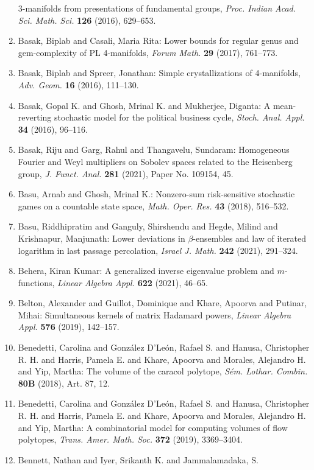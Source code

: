 \begin{enumerate}
3-manifolds from presentations of fundamental groups, \emph{Proc. Indian Acad. Sci. Math. Sci.} {\bf 126} (2016), 629--653.
\item Basak, Biplab and Casali, Maria Rita: Lower bounds for regular genus and gem-complexity of {PL}
4-manifolds, \emph{Forum Math.} {\bf 29} (2017), 761--773.
\item Basak, Biplab and Spreer, Jonathan: Simple crystallizations of 4-manifolds, \emph{Adv. Geom.} {\bf 16} (2016), 111--130.
\item Basak, Gopal K. and Ghosh, Mrinal K. and Mukherjee, Diganta: A mean-reverting stochastic model for the political business
cycle, \emph{Stoch. Anal. Appl.} {\bf 34} (2016), 96--116.
\item Basak, Riju and Garg, Rahul and Thangavelu, Sundaram: Homogeneous {F}ourier and {W}eyl multipliers on {S}obolev
spaces related to the {H}eisenberg group, \emph{J. Funct. Anal.} {\bf 281} (2021), Paper No. 109154, 45.
\item Basu, Arnab and Ghosh, Mrinal K.: Nonzero-sum risk-sensitive stochastic games on a countable
state space, \emph{Math. Oper. Res.} {\bf 43} (2018), 516--532.
\item Basu, Riddhipratim and Ganguly, Shirshendu and Hegde, Milind
and Krishnapur, Manjunath: Lower deviations in {$\beta$}-ensembles and law of iterated
logarithm in last passage percolation, \emph{Israel J. Math.} {\bf 242} (2021), 291--324.
\item Behera, Kiran Kumar: A generalized inverse eigenvalue problem and {$m$}-functions, \emph{Linear Algebra Appl.} {\bf 622} (2021), 46--65.
\item Belton, Alexander and Guillot, Dominique and Khare, Apoorva
and Putinar, Mihai: Simultaneous kernels of matrix {H}adamard powers, \emph{Linear Algebra Appl.} {\bf 576} (2019), 142--157.
\item Benedetti, Carolina and Gonz\'{a}lez D'Le\'{o}n, Rafael S. and Hanusa,
Christopher R. H. and Harris, Pamela E. and Khare, Apoorva and
Morales, Alejandro H. and Yip, Martha: The volume of the caracol polytope, \emph{S\'{e}m. Lothar. Combin.} {\bf 80B} (2018), Art. 87, 12.
\item Benedetti, Carolina and Gonz\'{a}lez D'Le\'{o}n, Rafael S. and Hanusa,
Christopher R. H. and Harris, Pamela E. and Khare, Apoorva and
Morales, Alejandro H. and Yip, Martha: A combinatorial model for computing volumes of flow polytopes, \emph{Trans. Amer. Math. Soc.} {\bf 372} (2019), 3369--3404.
\item Bennett, Nathan and Iyer, Srikanth K. and Jammalamadaka, S.

\end{enumerate}
